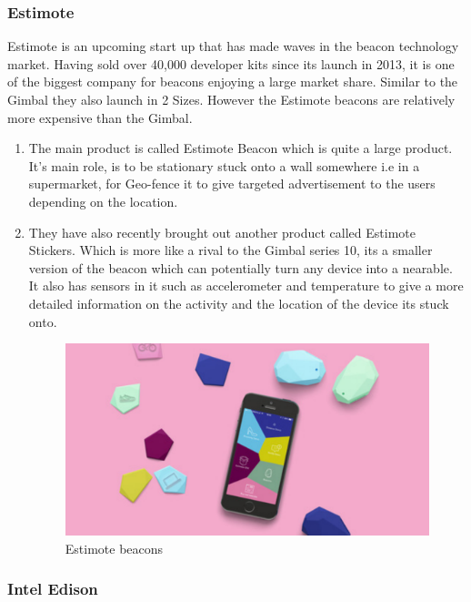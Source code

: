 \subsubsection{Estimote}

Estimote\cite{estimote} is an upcoming start up that has made waves
in the beacon technology market. Having sold over 40,000 developer
kits since its launch in 2013, it is one of the biggest company for
beacons enjoying a large market share. Similar to the Gimbal they
also launch in 2 Sizes. However the Estimote beacons are relatively
more expensive than the Gimbal.
\begin{enumerate}
\item The main product is called Estimote Beacon which is quite a large
product. It's main role, is to be stationary stuck onto a wall somewhere
i.e in a supermarket, for Geo-fence it to give targeted advertisement
to the users depending on the location.  
\item They have also recently brought out another product called Estimote
Stickers. Which is more like a rival to the Gimbal series 10, its
a smaller version of the beacon which can potentially turn any device
into a nearable. It also has sensors in it such as accelerometer and
temperature to give a more detailed information on the activity and
the location of the device its stuck onto.
\begin{figure}[H]
\includegraphics[scale=0.3]{images/estimote}

\protect\caption{Estimote beacons}


\end{figure}

\end{enumerate}

\subsubsection{Intel Edison}


